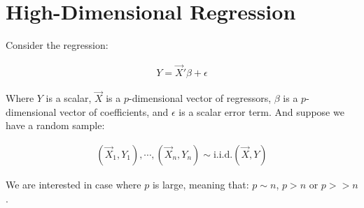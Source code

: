 \section{High-Dimensional Regression}

Consider the regression: 

\begin{align*}
    Y = \Vec{X}'\beta + \epsilon
\end{align*}

Where $Y$ is a scalar, $\Vec{X}$ is a $p$-dimensional vector of regressors, $\beta$ is a $p$-dimensional vector of coefficients, and $\epsilon$ is a scalar error term. And suppose we have a random sample:

\begin{align*}
    (\Vec{X}_1, Y_1), \cdots, (\Vec{X}_n, Y_n) \sim \text{i.i.d.} (\Vec{X}, Y)
\end{align*}

We are interested in case where $p$ is large, meaning that: $p \sim n$, $p > n$ or $p >> n$.

